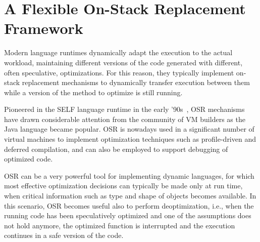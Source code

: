 
\section{A Flexible On-Stack Replacement Framework}

Modern language runtimes dynamically adapt the execution to the actual workload, maintaining different versions of the code generated with different, often speculative, optimizations. For this reason, they typically implement on-stack replacement mechanisms to dynamically transfer execution between them while a version of the method to optimize is still running.

Pioneered in the SELF language runtime in the early '90s~\cite{Holzle92}, OSR mechanisms have drawn considerable attention from the community of VM builders as the Java language became popular. OSR is nowadays used in a significant number of virtual machines to implement optimization techniques such as profile-driven and deferred compilation, and can also be employed to support debugging of optimized code.

\noindent OSR can be a very powerful tool for implementing dynamic languages, for which most effective optimization decisions can typically be made only at run time, when critical information such as type and shape of objects becomes available. In this scenario, OSR becomes useful also to perform deoptimization, i.e., when the running code has been speculatively optimized and one of the assumptions does not hold anymore, the optimized function is interrupted and the execution continues in a safe version of the code.


